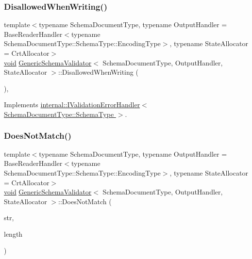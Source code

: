 \subsubsection{\texorpdfstring{Disallowed\+When\+Writing()}{DisallowedWhenWriting()}}
{\footnotesize\ttfamily template$<$typename Schema\+Document\+Type, typename Output\+Handler = Base\+Reader\+Handler$<$typename Schema\+Document\+Type\+::\+Schema\+Type\+::\+Encoding\+Type$>$, typename State\+Allocator = Crt\+Allocator$>$ \\
\hyperlink{imgui__impl__opengl3__loader_8h_ac668e7cffd9e2e9cfee428b9b2f34fa7}{void} \hyperlink{classGenericSchemaValidator}{Generic\+Schema\+Validator}$<$ Schema\+Document\+Type, Output\+Handler, State\+Allocator $>$\+::Disallowed\+When\+Writing (\begin{DoxyParamCaption}{ }\end{DoxyParamCaption})\hspace{0.3cm}{\ttfamily [inline]}, {\ttfamily [virtual]}}



Implements \hyperlink{classinternal_1_1IValidationErrorHandler_a1a7e9f0a384be3e0d6ae63d8fe366363}{internal\+::\+I\+Validation\+Error\+Handler$<$ Schema\+Document\+Type\+::\+Schema\+Type $>$}.

\mbox{\label{classGenericSchemaValidator_af1be05889e634936c223f24c6e5f6ec5}} 
\subsubsection{\texorpdfstring{Does\+Not\+Match()}{DoesNotMatch()}}
{\footnotesize\ttfamily template$<$typename Schema\+Document\+Type, typename Output\+Handler = Base\+Reader\+Handler$<$typename Schema\+Document\+Type\+::\+Schema\+Type\+::\+Encoding\+Type$>$, typename State\+Allocator = Crt\+Allocator$>$ \\
\hyperlink{imgui__impl__opengl3__loader_8h_ac668e7cffd9e2e9cfee428b9b2f34fa7}{void} \hyperlink{classGenericSchemaValidator}{Generic\+Schema\+Validator}$<$ Schema\+Document\+Type, Output\+Handler, State\+Allocator $>$\+::Does\+Not\+Match (\begin{DoxyParamCaption}\item[{const \hyperlink{classGenericSchemaValidator_a8b7dab5a0cda9cc0adaefb4401d260c1}{Ch} $\ast$}]{str,  }\item[{\hyperlink{rapidjson_8h_a5ed6e6e67250fadbd041127e6386dcb5}{Size\+Type}}]{length }\end{DoxyParamCaption})\hspace{0.3cm}{\ttfamily [inline]}}

